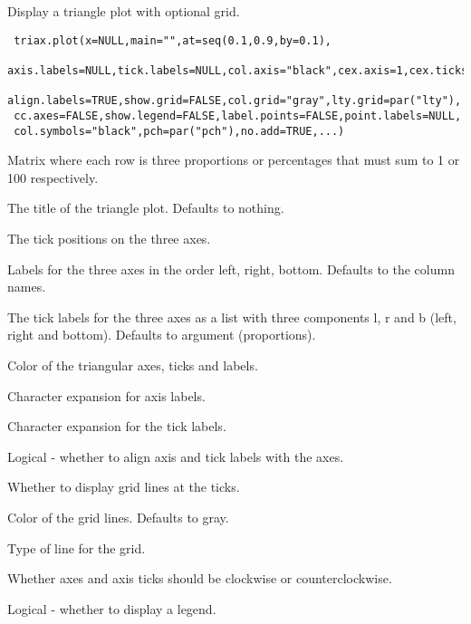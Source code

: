 \begin{Description}\relax
Display a triangle plot with optional grid.
\end{Description}
\begin{Usage}
\begin{verbatim}
 triax.plot(x=NULL,main="",at=seq(0.1,0.9,by=0.1),
 axis.labels=NULL,tick.labels=NULL,col.axis="black",cex.axis=1,cex.ticks=1,
 align.labels=TRUE,show.grid=FALSE,col.grid="gray",lty.grid=par("lty"),
 cc.axes=FALSE,show.legend=FALSE,label.points=FALSE,point.labels=NULL,
 col.symbols="black",pch=par("pch"),no.add=TRUE,...)
\end{verbatim}
\end{Usage}
\begin{Arguments}
\begin{ldescription}
\item[\code{x}] Matrix where each row is three proportions or percentages
that must sum to 1 or 100 respectively.
\item[\code{main}] The title of the triangle plot. Defaults to nothing.
\item[\code{at}] The tick positions on the three axes.
\item[\code{axis.labels}] Labels for the three axes in the order left, right,
bottom. Defaults to the column names.
\item[\code{tick.labels}] The tick labels for the three axes as a list with
three components l, r and b (left, right and bottom).
Defaults to argument  (proportions).
\item[\code{col.axis}] Color of the triangular axes, ticks and labels.
\item[\code{cex.axis}] Character expansion for axis labels.
\item[\code{cex.ticks}] Character expansion for the tick labels.
\item[\code{align.labels}] Logical - whether to align axis and tick labels with
the axes.
\item[\code{show.grid}] Whether to display grid lines at the ticks.
\item[\code{col.grid}] Color of the grid lines. Defaults to gray.
\item[\code{lty.grid}] Type of line for the grid.
\item[\code{cc.axes}] Whether axes and axis ticks should be clockwise or
counterclockwise.
\item[\code{show.legend}] Logical - whether to display a legend.

\end{ldescription}
\end{Arguments}
